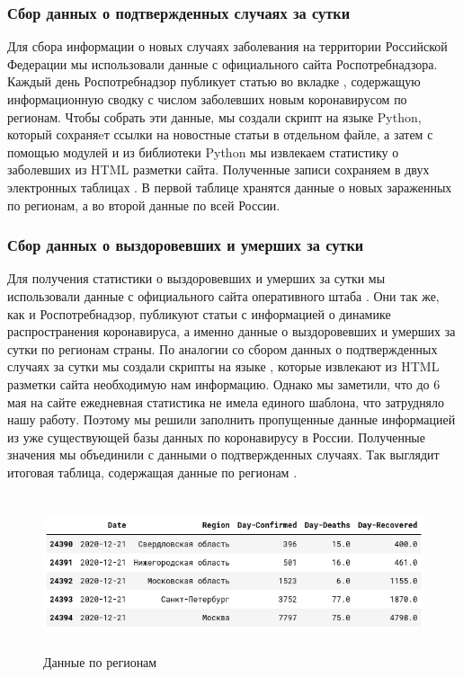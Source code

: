 \documentclass[a4paper, 12pt]{extarticle}
\begin{document}
\subsubsection{Сбор данных о подтвержденных случаях за сутки}
Для сбора информации о новых случаях заболевания на территории Российской Федерации мы использовали данные с официального сайта Роспотребнадзора. Каждый день Роспотребнадзор публикует статью во вкладке , содержащую информационную сводку с числом заболевших новым коронавирусом по регионам. Чтобы собрать эти данные, мы создали скрипт на языке Python, который сохраняeт ссылки на новостные статьи в отдельном файле, а затем с помощью модулей  и  из библиотеки Python мы извлекаем статистику о заболевших из HTML разметки сайта. Полученные записи сохраняем в двух электронных таблицах . В первой таблице хранятся данные о новых зараженных по регионам, а во второй данные по всей России.

\subsubsection{Сбор данных о выздоровевших и умерших за сутки}
Для получения статистики о выздоровевших и умерших за сутки мы использовали данные с официального сайта оперативного штаба .  Они так же, как и Роспотребнадзор, публикуют статьи с информацией о динамике распространения коронавируса, а именно данные о выздоровевших и умерших за сутки по регионам страны. По аналогии со сбором данных о подтвержденных случаях за сутки мы создали скрипты на языке , которые извлекают из HTML разметки сайта необходимую нам информацию. Однако мы заметили, что до 6 мая на сайте  ежедневная статистика не имела единого шаблона, что затрудняло нашу работу. Поэтому мы решили заполнить пропущенные данные информацией из уже существующей базы данных по коронавирусу в России. Полученные значения мы объединили с данными о подтвержденных случаях.  Так выглядит итоговая таблица, содержащая данные по регионам .

\begin{figure}[h]
    \centering
    \includegraphics[height=130pt]{../plots/regions_df2.png}
    \caption{Данные по регионам} \label{fig:collection2_res}
\end{figure}
\newpage
\end{document}
